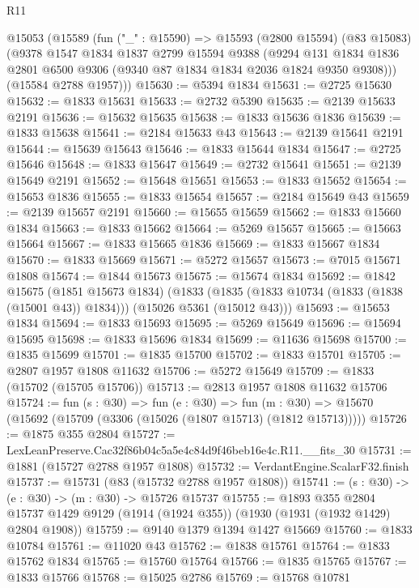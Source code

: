 \begin{lexlean}{R11}
\begin{coremodule}
  @15053
    (@15589
      (fun ("_" : @15590) =>
      @15593
        (@2800 @15594)
        (@83 @15083)
        (@9378
          @1547
          @1834
          @1837
          @2799
          @15594
          @9388
          (@9294
            @131
            @1834
            @1836
            @2801
            @6500
            @9306
            (@9340 @87 @1834 @1834 @2036 @1824 @9350 @9308)))
        (@15584 @2788 @1957)))
@15630 := @5394 @1834
@15631 := @2725 @15630
@15632 := @1833 @15631
@15633 := @2732 @5390
@15635 := @2139 @15633 @2191
@15636 := @15632 @15635
@15638 := @1833 @15636 @1836
@15639 := @1833 @15638
@15641 := @2184 @15633 @43
@15643 := @2139 @15641 @2191
@15644 := @15639 @15643
@15646 := @1833 @15644 @1834
@15647 := @2725 @15646
@15648 := @1833 @15647
@15649 := @2732 @15641
@15651 := @2139 @15649 @2191
@15652 := @15648 @15651
@15653 := @1833 @15652
@15654 := @15653 @1836
@15655 := @1833 @15654
@15657 := @2184 @15649 @43
@15659 := @2139 @15657 @2191
@15660 := @15655 @15659
@15662 := @1833 @15660 @1834
@15663 := @1833 @15662
@15664 := @5269 @15657
@15665 := @15663 @15664
@15667 := @1833 @15665 @1836
@15669 := @1833 @15667 @1834
@15670 := @1833 @15669
@15671 := @5272 @15657
@15673 := @7015 @15671 @1808
@15674 := @1844 @15673
@15675 := @15674 @1834
@15692 := @1842
    @15675
    (@1851 @15673 @1834)
    (@1833 (@1835 (@1833 @10734 (@1833 (@1838 (@15001 @43)) @1834))) (@15026 @5361 (@15012 @43)))
@15693 := @15653 @1834
@15694 := @1833 @15693
@15695 := @5269 @15649
@15696 := @15694 @15695
@15698 := @1833 @15696 @1834
@15699 := @11636 @15698
@15700 := @1835 @15699
@15701 := @1835 @15700
@15702 := @1833 @15701
@15705 := @2807 @1957 @1808 @11632
@15706 := @5272 @15649
@15709 := @1833 (@15702 (@15705 @15706))
@15713 := @2813 @1957 @1808 @11632 @15706
@15724 := fun (s : @30) =>
  fun (e : @30) =>
  fun (m : @30) => @15670 (@15692 (@15709 (@3306 (@15026 (@1807 @15713) (@1812 @15713)))))
@15726 := @1875 @355 @2804
@15727 := LexLeanPreserve.Cac32f86b04c5a5e4c84d9f46beb16e4c.R11.__fits_30
@15731 := @1881 (@15727 @2788 @1957 @1808)
@15732 := VerdantEngine.ScalarF32.finish
@15737 := @15731 (@83 (@15732 @2788 @1957 @1808))
@15741 := (s : @30) -> (e : @30) -> (m : @30) -> @15726 @15737
@15755 := @1893
    @355
    @2804
    @15737
    @1429
    @9129
    (@1914 (@1924 @355))
    (@1930 (@1931 (@1932 @1429) @2804 @1908))
@15759 := @9140 @1379 @1394 @1427 @15669
@15760 := @1833 @10784
@15761 := @11020 @43
@15762 := @1838 @15761
@15764 := @1833 @15762 @1834
@15765 := @15760 @15764
@15766 := @1835 @15765
@15767 := @1833 @15766
@15768 := @15025 @2786
@15769 := @15768 @10781

\end{coremodule}
\end{lexlean}
